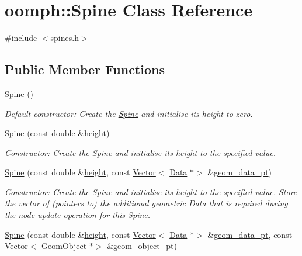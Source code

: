 \hypertarget{classoomph_1_1Spine}{}\section{oomph\+:\+:Spine Class Reference}
\label{classoomph_1_1Spine}


{\ttfamily \#include $<$spines.\+h$>$}

\subsection*{Public Member Functions}
\begin{DoxyCompactItemize}
\item 
\hyperlink{classoomph_1_1Spine_a93fe5032eec46631288d4c098f49e89a}{Spine} ()
\begin{DoxyCompactList}\small\item\em Default constructor\+: Create the \hyperlink{classoomph_1_1Spine}{Spine} and initialise its height to zero. \end{DoxyCompactList}\item 
\hyperlink{classoomph_1_1Spine_a7a8e8d3030dabfc977e978ceb1363c3b}{Spine} (const double \&\hyperlink{classoomph_1_1Spine_a7502bf089f4001796d5ef801cf104a28}{height})
\begin{DoxyCompactList}\small\item\em Constructor\+: Create the \hyperlink{classoomph_1_1Spine}{Spine} and initialise its height to the specified value. \end{DoxyCompactList}\item 
\hyperlink{classoomph_1_1Spine_a2da64547ad53a6c00ab06f0217bcb397}{Spine} (const double \&\hyperlink{classoomph_1_1Spine_a7502bf089f4001796d5ef801cf104a28}{height}, const \hyperlink{classoomph_1_1Vector}{Vector}$<$ \hyperlink{classoomph_1_1Data}{Data} $\ast$$>$ \&\hyperlink{classoomph_1_1Spine_aaf0954f69bd9bed913e714fafaad4644}{geom\+\_\+data\+\_\+pt})
\begin{DoxyCompactList}\small\item\em Constructor\+: Create the \hyperlink{classoomph_1_1Spine}{Spine} and initialise its height to the specified value. Store the vector of (pointers to) the additional geometric \hyperlink{classoomph_1_1Data}{Data} that is required during the node update operation for this \hyperlink{classoomph_1_1Spine}{Spine}. \end{DoxyCompactList}\item 
\hyperlink{classoomph_1_1Spine_a482bd3c74deddb27c1c7ce2e4eb6ae42}{Spine} (const double \&\hyperlink{classoomph_1_1Spine_a7502bf089f4001796d5ef801cf104a28}{height}, const \hyperlink{classoomph_1_1Vector}{Vector}$<$ \hyperlink{classoomph_1_1Data}{Data} $\ast$$>$ \&\hyperlink{classoomph_1_1Spine_aaf0954f69bd9bed913e714fafaad4644}{geom\+\_\+data\+\_\+pt}, const \hyperlink{classoomph_1_1Vector}{Vector}$<$ \hyperlink{classoomph_1_1GeomObject}{Geom\+Object} $\ast$$>$ \&\hyperlink{classoomph_1_1Spine_a68253ccfbfdf33e773dd300dcc4ec42c}{geom\+\_\+object\+\_\+pt})
$$
\end{DoxyCompactItemize}
